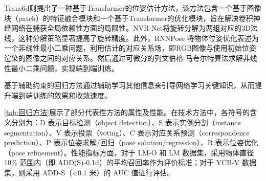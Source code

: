 \par Trans6d\cite{zhang2022trans6d}则提出了一种基于Transformer的位姿估计方法，该方法包含一个基于图像块（patch）的特征融合模块和一个基于Transformer的优化模块，旨在解决卷积神经网络在捕获全局依赖性方面的局限性。NVR-Net\cite{feng2023nvr}将旋转分解为两组对应的3D法线，这种分解策略显著提高了旋转精度。此外，RNNPose\cite{Xu2024RNNPose} 将物体位姿优化表述为一个非线性最小二乘问题，利用估计的对应关系场，即RGB图像与使用初始位姿渲染的图像之间的对应关系。然后通过可微分的列文伯格-马夸尔特算法\cite{Levenberg_Marquardt}求解非线性最小二乘问题，实现端到端训练。

\par 基于辅助约束的回归方法通过辅助学习其他信息来引导网络学习关键知识，从而提升端到端训练的效果和收敛速度。

\autoref{tab:回归方法}展示了部分代表性方法的属性及性能。在技术方法中，各符号的含义分别为：D 表示目标检测（object detection）、S 表示实例分割（instance segmentation）、V 表示投票（voting）、C 表示对应关系预测（correspondence prediction）、P 表示位姿求解/回归（pose solution/regression）、R 表示位姿优化（pose refinement）。性能指标方面，对于 LM-O 和 LM 数据集，采用物体直径 10\% 范围内（即 ADD(S)-0.1d）的平均召回率作为评价标准；对于 YCB-V 数据集，则采用 ADD-S（<0.1 米）的 AUC 值进行评估。


